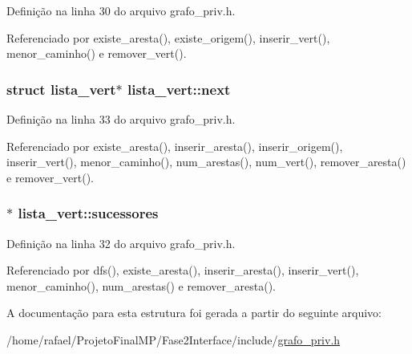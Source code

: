 Definição na linha 30 do arquivo grafo\+\_\+priv.\+h.



Referenciado por existe\+\_\+aresta(), existe\+\_\+origem(), inserir\+\_\+vert(), menor\+\_\+caminho() e remover\+\_\+vert().

\hypertarget{structlista__vert_a772eebf412b0d7e40a73f5989e6a1835}{}
\subsubsection[{next}]{\setlength{\rightskip}{0pt plus 5cm}struct {\bf lista\+\_\+vert}$\ast$ lista\+\_\+vert\+::next}\label{structlista__vert_a772eebf412b0d7e40a73f5989e6a1835}


Definição na linha 33 do arquivo grafo\+\_\+priv.\+h.



Referenciado por existe\+\_\+aresta(), inserir\+\_\+aresta(), inserir\+\_\+origem(), inserir\+\_\+vert(), menor\+\_\+caminho(), num\+\_\+arestas(), num\+\_\+vert(), remover\+\_\+aresta() e remover\+\_\+vert().

\hypertarget{structlista__vert_ac003e2d2beffcf2432cac5460cf82263}{}
\subsubsection[{sucessores}]{$\ast$ lista\+\_\+vert\+::sucessores}\label{structlista__vert_ac003e2d2beffcf2432cac5460cf82263}


Definição na linha 32 do arquivo grafo\+\_\+priv.\+h.



Referenciado por dfs(), existe\+\_\+aresta(), inserir\+\_\+aresta(), inserir\+\_\+vert(), menor\+\_\+caminho(), num\+\_\+arestas() e remover\+\_\+aresta().



A documentação para esta estrutura foi gerada a partir do seguinte arquivo\+:\begin{DoxyCompactItemize}
\item 
/home/rafael/\+Projeto\+Final\+M\+P/\+Fase2\+Interface/include/\hyperlink{grafo__priv_8h}{grafo\+\_\+priv.\+h}\end{DoxyCompactItemize}
